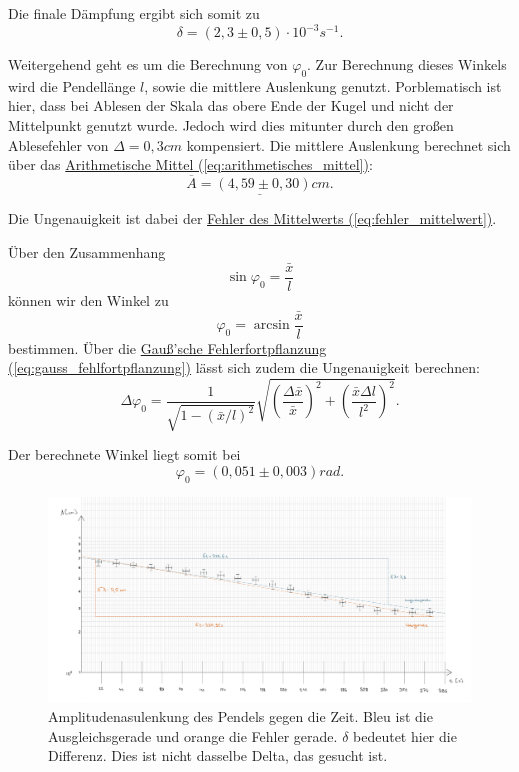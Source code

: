 Die finale Dämpfung ergibt sich somit zu 
\begin{equation}
\boxed{
    \delta = (2,3 \pm 0,5) \cdot 10^{-3} s^{-1}
}.
\end{equation}

Weitergehend geht es um die Berechnung von $\varphi_0$. Zur Berechnung dieses Winkels wird die Pendellänge $l$, sowie die mittlere Auslenkung genutzt. Porblematisch ist hier, dass bei Ablesen der Skala das obere Ende der Kugel und nicht der Mittelpunkt genutzt wurde. Jedoch wird dies mitunter durch den großen Ablesefehler von $\Delta = 0,3cm$ kompensiert. Die mittlere Auslenkung berechnet sich über das \hyperref[eq:arithmetisches_mittel]{Arithmetische Mittel (\ref*{eq:arithmetisches_mittel})}:
\begin{equation}
    \underline{
        \overline{A} = (4,59 \pm 0,30) cm.
    }
\end{equation}

Die Ungenauigkeit ist dabei der \hyperref[eq:fehler_mittelwert]{Fehler des Mittelwerts (\ref*{eq:fehler_mittelwert})}.

Über den Zusammenhang
\begin{equation}
\sin \varphi_0 = \frac{\bar x}{l}
\end{equation}
können wir den Winkel zu
\begin{equation}
    \varphi_0 = \arcsin \frac{\bar x}{l} 
\end{equation}
bestimmen. 
Über die \hyperref[eq:gauss_fehlfortpflanzung]{Gauß'sche Fehlerfortpflanzung (\ref*{eq:gauss_fehlfortpflanzung})} lässt sich zudem die Ungenauigkeit berechnen:
\begin{equation}
    \Delta \varphi_0 = \frac{1}{\sqrt{1 - (\bar x/l)^2}} \sqrt{{\left(\frac{\Delta \bar x}{\bar x}\right)^2 + \left(\frac{\bar x\Delta l}{l^2}\right)^2}}.
\end{equation}

Der berechnete Winkel liegt somit bei
\begin{equation}
    \boxed{
        \varphi_0 = (0,051 \pm 0,003) rad
    }.
\end{equation}

\onecolumn
\begin{figure}
    \hspace*{-2.4cm}
    \centering
    \includegraphics[width=1.3\textwidth]{img/14/BetterPlot.pdf}
    \caption{Amplitudenasulenkung des Pendels gegen die Zeit. Bleu ist die Ausgleichsgerade und orange die Fehler gerade. $\delta$ bedeutet hier die Differenz. Dies ist nicht dasselbe Delta, das gesucht ist.}
    \label{fig:plot} 
\end{figure}
\twocolumn

